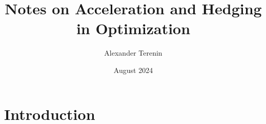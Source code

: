 \documentclass{article}
\title{Notes on Acceleration and Hedging in Optimization}
\author{Alexander Terenin}
\date{August 2024}
\begin{document}
\maketitle

\section{Introduction}
\end{document}
